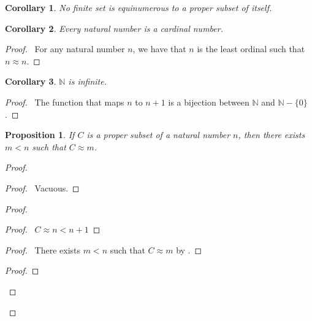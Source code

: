 \documentclass{book}
\let\qed\relax
\newtheorem{prop}[ax]{Proposition}
\newtheorem{cor}{Corollary}[ax]
\theoremstyle{definition}
\begin{document}
\begin{cor}
No finite set is equinumerous to a proper subset of itself.
\end{cor}

\begin{cor}
Every natural number is a cardinal number.
\end{cor}

\begin{proof}
\pf\ For any natural number $n$, we have that $n$ is the least ordinal such that $n \approx n$. \qed
\end{proof}

\begin{cor}
$\mathbb{N}$ is infinite.
\end{cor}

\begin{proof}
\pf\ The function that maps $n$ to $n+1$ is a bijection between $\mathbb{N}$ and $\mathbb{N} - \{0\}$. \qed
\end{proof}

\begin{prop}
If $C$ is a proper subset of a natural number $n$, then there exists $m < n$ such that $C \approx m$.
\end{prop}

\begin{proof}
\pf
{}
\begin{proof}
	\pf\ Vacuous.
\end{proof}
\begin{proof}
	\begin{proof}
		\pf\ $C \approx n < n+1$
	\end{proof}
	\begin{proof}
		\pf\ There exists $m < n$ such that $C \approx m$ by .
	\end{proof}
	\begin{proof}
	\end{proof}
\end{proof}
\qed
\end{proof}
\end{document}

